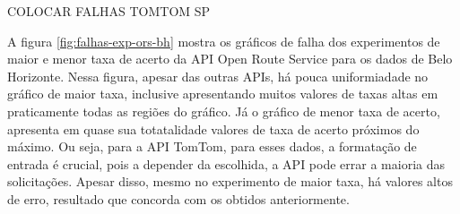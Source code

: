 COLOCAR FALHAS TOMTOM SP

A figura \ref{fig:falhas-exp-ors-bh} mostra os gráficos de falha dos experimentos de maior e menor taxa de acerto da API Open Route Service para os dados de Belo Horizonte. Nessa figura, apesar das outras APIs, há pouca uniformiadade no gráfico de maior taxa, inclusive apresentando muitos valores de taxas altas em praticamente todas as regiões do gráfico. Já o gráfico de menor taxa de acerto, apresenta em quase sua totatalidade valores de taxa de acerto próximos do máximo. Ou seja, para a API TomTom, para esses dados, a formatação de entrada é crucial, pois a depender da escolhida, a API pode errar a maioria das solicitações. Apesar disso, mesmo no experimento de maior taxa, há valores altos de erro, resultado que concorda com os obtidos anteriormente.

